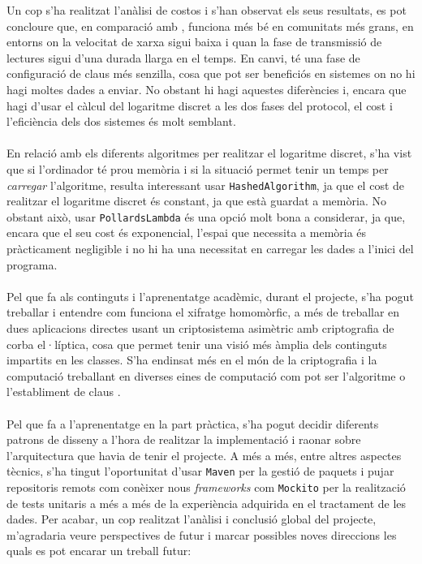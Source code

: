 
Un cop s'ha realitzat l'anàlisi de costos i s'han observat els seus resultats, es pot concloure que, en comparació amb \cite{busom}, \cite{recsi} funciona més bé en comunitats més grans, en entorns on la velocitat de xarxa sigui baixa i quan la fase de transmissió de lectures sigui d'una durada llarga en el temps. En canvi, \cite{busom} té una fase de configuració de claus més senzilla, cosa que pot ser beneficiós en sistemes on no hi hagi moltes dades a enviar. No obstant hi hagi aquestes diferències i, encara que \cite{recsi} hagi d'usar el càlcul del logaritme discret a les dos fases del protocol, el cost i l'eficiència dels dos sistemes és molt semblant.
\\
\\
En relació amb els diferents algoritmes per realitzar el logaritme discret, s'ha vist que si l'ordinador té prou memòria i si la situació permet tenir un temps per \textit{carregar} l'algoritme, resulta interessant usar \texttt{HashedAlgorithm}, ja que el cost de realitzar el logaritme discret és constant, ja que està guardat a memòria. No obstant això, usar \texttt{PollardsLambda} és una opció molt bona a considerar, ja que, encara que el seu cost és exponencial, l'espai que necessita a memòria és pràcticament negligible i no hi ha una necessitat en carregar les dades a l'inici del programa.
\\
\\
Pel que fa als continguts i l'aprenentatge acadèmic, durant el projecte, s'ha pogut treballar i entendre com funciona el xifratge homomòrfic, a més de treballar en dues aplicacions directes usant un criptosistema asimètric amb criptografia de corba el·líptica, cosa que permet tenir una visió més àmplia dels continguts impartits en les classes. S'ha endinsat més en el món de la criptografia i la computació treballant en diverses eines de computació com pot ser l'algoritme \cite{kangaroo} o l'establiment de claus \cite{diffie-hellman}.
\\
\\
Pel que fa a l'aprenentatge en la part pràctica, s'ha pogut decidir diferents patrons de disseny a l'hora de realitzar la implementació i raonar sobre l'arquitectura que havia de tenir el projecte. A més a més, entre altres aspectes tècnics, s'ha tingut l'oportunitat d'usar \texttt{Maven} per la gestió de paquets i pujar repositoris remots com conèixer nous \textit{frameworks} com \texttt{Mockito} per la realització de tests unitaris a més a més de la experiència adquirida en el tractament de les dades.
\newpage
Per acabar, un cop realitzat l'anàlisi i conclusió global del projecte, m'agradaria veure perspectives de futur i marcar possibles noves direccions les quals es pot encarar un treball futur:
